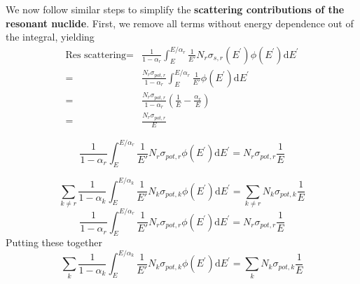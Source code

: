 \documentclass{beamer}
\begin{document}
\begin{frame}
  
We now follow similar steps to simplify the \textbf{scattering contributions of the resonant nuclide}. First, we remove all terms without energy dependence out of the integral, yielding
  \begin{align*}\mbox{Res scattering}=&\frac{1}{1-\alpha_{r}}\int_{E}^{E/\alpha_{r}}\frac{1}{E'}N_{r}\sigma_{s,r}\left(E^{\prime}\right)\phi\left(E^{\prime}\right)\mathrm{d}E^{\prime} \\
    =& \frac{N_{r}\sigma_{pot,r}}{1-\alpha_{r}}\int_{E}^{E/\alpha_{r}}\frac{1}{E'}\phi\left(E^{\prime}\right)\mathrm{d}E^{\prime}
  \\= &\frac{N_{r}\sigma_{pot,r}}{1-\alpha_{r}}\left(\frac{1}{E}-\frac{\alpha_r}{E}\right)
  \\
    =&\frac{N_{r}\sigma_{pot,r}}{E}
\end{align*}


  \begin{equation*}\boxed{\frac{1}{1-\alpha_{r}}\int_{E}^{E/\alpha_{r}}\frac{1}{E'}N_{r}\sigma_{pot,r}\phi\left(E^{\prime}\right)\mathrm{d}E^{\prime}=N_{r}\sigma_{pot,r}\frac{1}{E}}\end{equation*}
\end{frame}

\begin{frame}
  \begin{equation*}{\sum\limits_{k\neq r}\frac{1}{1-\alpha_{k}}\int_{E}^{E/\alpha_{k}}\frac{1}{E'}N_{k}\sigma_{pot,k}\phi\left(E^{\prime}\right)\mathrm{d}E^{\prime}=\sum\limits_{k\neq r}N_{k}\sigma_{pot,k}\frac{1}{E}}\label{eq:NR-mainConclusion1}\end{equation*}
  \begin{equation*}{\frac{1}{1-\alpha_{r}}\int_{E}^{E/\alpha_{r}}\frac{1}{E'}N_{r}\sigma_{pot,r}\phi\left(E^{\prime}\right)\mathrm{d}E^{\prime}=N_{r}\sigma_{pot,r}\frac{1}{E}}\end{equation*}
    \[~\]
    Putting these together
  \begin{equation*}{\sum\limits_{k}\frac{1}{1-\alpha_{k}}\int_{E}^{E/\alpha_{k}}\frac{1}{E'}N_{k}\sigma_{pot,k}\phi\left(E^{\prime}\right)\mathrm{d}E^{\prime}=\sum\limits_{k}N_{k}\sigma_{pot,k}\frac{1}{E}}\label{eq:NR-mainConclusion1}\end{equation*}

\end{frame}
\end{document}
